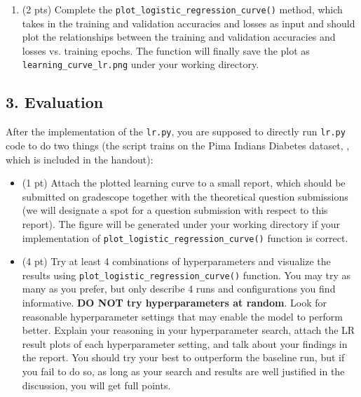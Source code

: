\documentclass{article}
\begin{document}
\begin{enumerate}
    \item (2 pts) Complete the \texttt{plot\_\allowbreak logistic\_\allowbreak regression\_\allowbreak curve()} method, which takes in the training and validation accuracies and losses as input and should plot the relationships between the training and validation accuracies and losses vs. training epochs. The function will finally save the plot as \texttt{learning\_\allowbreak curve\_\allowbreak lr.png} under your working directory.
\end{enumerate}

\subsection*{3. Evaluation}
After the implementation of the \texttt{lr.py}, you are supposed to directly run \texttt{lr.py} code to do two things (the script trains on the Pima Indians Diabetes dataset, , which is included in the handout):
\begin{itemize}
        \item  (1 pt) Attach the plotted learning curve to a small report, which should be submitted on gradescope together with the theoretical question submissions (we will designate a spot for a question submission with respect to this report). The figure will be generated under your
working directory if your implementation of \texttt{plot\_\allowbreak logistic\_\allowbreak regression\_\allowbreak curve()} function is correct.
    \item  (4 pt) Try at least 4 combinations of hyperparameters and visualize the results using \texttt{plot\_\allowbreak logistic\_\allowbreak regression\_\allowbreak curve()} function. You may try as many as you prefer, but only describe 4 runs and configurations you find informative. \textbf{DO NOT try hyperparameters at random}. Look for reasonable hyperparameter settings that may enable the model to perform better. Explain your reasoning in your hyperparameter search, attach the LR result plots of each hyperparameter setting, and talk about your findings in the report. You should try your best to outperform the baseline run, but if you fail to do so, as long as your search and results are well justified in the discussion, you will get full points.
    
\end{itemize}
\clearpage
\end{document}
